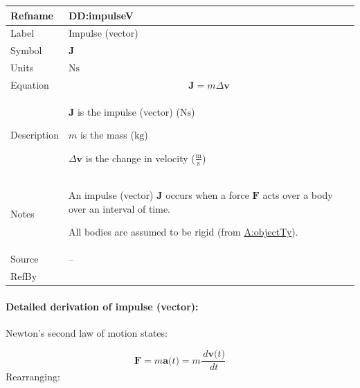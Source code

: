 \documentclass[12pt]{article}
\begin{document}
\vspace{\baselineskip}
\noindent
\begin{minipage}{\textwidth}
\begin{tabular}{>{\raggedright}p{}>{\raggedright\arraybackslash}p{}}
\toprule \textbf{Refname} & \textbf{DD:impulseV}
\label{DD:impulseV}
\\ \midrule
Label & Impulse (vector)
        
\\ \midrule
Symbol & $\symbf{J}$
         
\\ \midrule
Units & $\text{N}\text{s}$
        
\\ \midrule
Equation & \begin{displaymath}
           \symbf{J}=m Δ\symbf{v}
           \end{displaymath}
\\ \midrule
Description & \begin{symbDescription}
              \item{$\symbf{J}$ is the impulse (vector) ($\text{N}\text{s}$)}
              \item{$m$ is the mass (${\text{kg}}$)}
              \item{$Δ\symbf{v}$ is the change in velocity ($\frac{\text{m}}{\text{s}}$)}
              \end{symbDescription}
\\ \midrule
Notes & An impulse (vector) $\symbf{J}$ occurs when a force $\symbf{F}$ acts over a body over an interval of time.
        
        All bodies are assumed to be rigid (from \hyperref[assumpOT]{A:objectTy}).
        
\\ \midrule
Source & --
         
\\ \midrule
RefBy & 
\\ \bottomrule
\end{tabular}
\end{minipage}
\paragraph{Detailed derivation of impulse (vector):}
\label{DD:impulseVDeriv}
Newton's second law of motion states:

\begin{displaymath}
\symbf{F}=m \symbf{a}\text{(}t\text{)}=m \frac{\,d\symbf{v}\text{(}t\text{)}}{\,dt}
\end{displaymath}
Rearranging:
\end{document}
